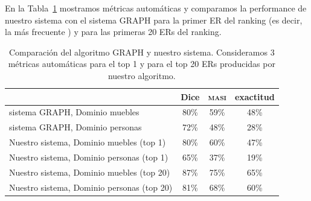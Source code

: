 



En la Tabla~\ref{Tabla_sis_1_20} mostramos m\'etricas autom\'aticas y comparamos la performance de nuestro sistema con el sistema GRAPH para la primer ER del ranking (es decir, la m\'as frecuente ) y para las primeras 20 ERs del ranking.
\vspace*{2cm}
\begin{table}[h]
\begin{center}
\begin{tabular}{|l|c|c|c|}
\hline
	 	& 	Dice		&	\textsc{masi}	&	exactitud		\\
\hline
sistema GRAPH, Dominio muebles	& 	80\% 		&	59\%	&	48\%		 	\\
sistema GRAPH, Dominio personas 	& 	72\%		&	48\%	&	28\%			\\
\hline
Nuestro sistema, Dominio muebles (top 1)	&	80\%		&	60\%	&	47\%		\\
Nuestro sistema, Dominio personas (top 1)	&	65\%		&	37\%	&	19\%		\\
\hline
Nuestro sistema, Dominio muebles (top 20)&	87\%		&	75\%  	&	65\%		\\
Nuestro sistema, Dominio personas (top 20)   &	81\%		&68\%	&	60\%		\\
\hline
\end{tabular}
\caption{Comparaci\'on del algoritmo GRAPH y nuestro sistema. Consideramos 3 m\'etricas autom\'aticas para el top 1 y para el top 20 ERs producidas por nuestro algoritmo.}
\label{Tabla_sis_1_20}
\end{center}
\end{table}

